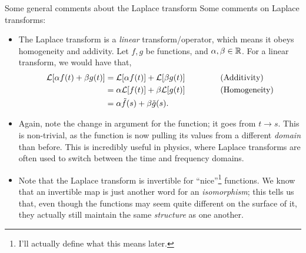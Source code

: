 \documentclass[11pt]{article}
\theoremstyle{mystyle}
\begin{document}
\begin{psremark}{Some general comments about the Laplace transform}{}
    Some comments on Laplace transforms:
    \begin{itemize}
        \item The Laplace transform is a \emph{linear} transform/operator,
        which means it obeys homogeneity and addivity. Let $f, g$
        be functions, and $\alpha, \beta \in \mathbb{R}$. 
        For a linear transform, we would have that,
        \begin{align*}
            \mathcal{L}[\alpha f(t) + \beta g(t)] & = \mathcal{L}[\alpha f(t)] + \mathcal{L}[\beta g(t)] \hspace{1.5cm} \text{(Additivity)}\\
            & = \alpha \mathcal{L}[f(t)] + \beta \mathcal{L}[g(t)] \hspace{1.5cm} \text{(Homogeneity)}\\
            & = \alpha \tilde{f}(s) + \beta \tilde{g}(s).
        \end{align*}
        \item Again, note the change in argument for the function;
        it goes from $t \to s$. This is non-trivial, as the function
        is now pulling its values from a different \emph{domain}
        than before. This is incredibly useful in physics,
        where Laplace transforms are often used to switch
        between the time and frequency domains.
        \item Note that the Laplace transform is invertible
        for ``nice''\footnote{I'll actually define what this means later.} functions.
        We know that an invertible map is just another word for 
        an \emph{isomorphism}; this tells us that, even though
        the functions may seem quite different on the surface
        of it, they actually still maintain the same \emph{structure}
        as one another.
    \end{itemize}
\end{psremark}
\end{document}
